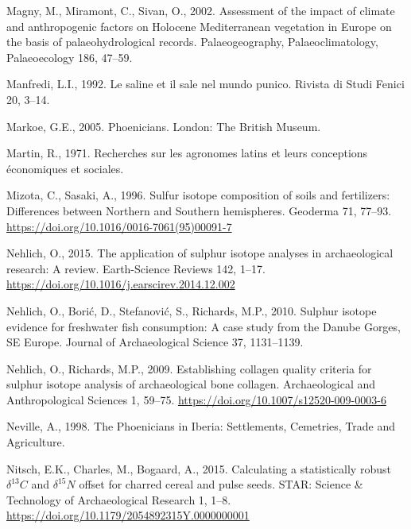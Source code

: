 \documentclass[preprint, 3p, authoryear]{elsarticle} %
\newlength{\cslhangindent}
\newlength{\cslentryspacingunit} %
\newenvironment{CSLReferences}[2] %
 {%
  \setlength{\parindent}{0pt}
  \ifodd #1
  \let\oldpar\par
  \def\par{\hangindent=\cslhangindent\oldpar}
  \fi
  \setlength{\parskip}{#2\cslentryspacingunit}
 }%
 {}
\begin{document}
\begin{CSLReferences}{1}{0}
\leavevmode{}%
Magny, M., Miramont, C., Sivan, O., 2002. Assessment of the impact of climate and anthropogenic factors on {Holocene Mediterranean} vegetation in {Europe} on the basis of palaeohydrological records. Palaeogeography, Palaeoclimatology, Palaeoecology 186, 47--59.

\leavevmode{}%
Manfredi, L.I., 1992. Le saline et il sale nel mundo punico. Rivista di Studi Fenici 20, 3--14.

\leavevmode{}%
Markoe, G.E., 2005. Phoenicians. {London}: {The British Museum}.

\leavevmode{}%
Martin, R., 1971. Recherches sur les agronomes latins et leurs conceptions économiques et sociales.

\leavevmode{}%
Mizota, C., Sasaki, A., 1996. Sulfur isotope composition of soils and fertilizers: {Differences} between {Northern} and {Southern} hemispheres. Geoderma 71, 77--93. \url{https://doi.org/10.1016/0016-7061(95)00091-7}

\leavevmode{}%
Nehlich, O., 2015. The application of sulphur isotope analyses in archaeological research: {A} review. Earth-Science Reviews 142, 1--17. \url{https://doi.org/10.1016/j.earscirev.2014.12.002}

\leavevmode{}%
Nehlich, O., Borić, D., Stefanović, S., Richards, M.P., 2010. Sulphur isotope evidence for freshwater fish consumption: A case study from the {Danube Gorges}, {SE Europe}. Journal of Archaeological Science 37, 1131--1139.

\leavevmode{}%
Nehlich, O., Richards, M.P., 2009. Establishing collagen quality criteria for sulphur isotope analysis of archaeological bone collagen. Archaeological and Anthropological Sciences 1, 59--75. \url{https://doi.org/10.1007/s12520-009-0003-6}

\leavevmode{}%
Neville, A., 1998. The {Phoenicians} in {Iberia}: {Settlements}, {Cemetries}, {Trade} and {Agriculture}.

\leavevmode{}%
Nitsch, E.K., Charles, M., Bogaard, A., 2015. Calculating a statistically robust \(\delta ^{13}C\) and \(\delta ^{15}N\) offset for charred cereal and pulse seeds. STAR: Science \& Technology of Archaeological Research 1, 1--8. \url{https://doi.org/10.1179/2054892315Y.0000000001}


\end{CSLReferences}
\end{document}
